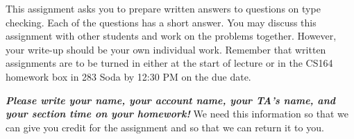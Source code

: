 \documentclass{article}
\begin{document}

This assignment asks you to prepare written answers to questions on
type checking. Each of the questions has a short answer. You
may discuss this assignment with other students and work on the
problems together.  However, your write-up should be your own
individual work.  Remember that written assignments are to be turned
in either at the start of lecture or in the CS164 homework box in 283
Soda by 12:30 PM on the due date.

\medskip

{\bf\em Please write your name, your account name, your TA's name, and
your section time on your homework!}  We need this information so that we
can give you credit for the assignment and so that we can return it to
you.

\bigskip
\end{document}
